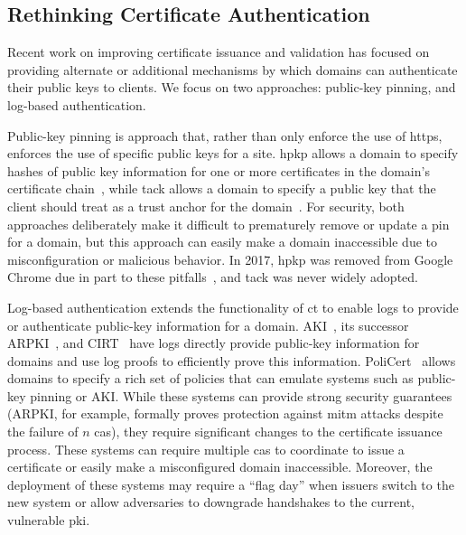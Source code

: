 \subsection{Rethinking Certificate Authentication}
\label{sec:background:issuance}

Recent work on improving certificate issuance and validation has focused on
providing alternate or additional mechanisms by which domains can authenticate
their public keys to clients. We focus on two approaches: public-key pinning,
and log-based authentication.

Public-key pinning is  approach that, rather than only enforce the use
of \ac{https}, enforces the use of specific public keys for a site. \ac{hpkp}
allows a domain to specify hashes of public key information for one or more
certificates in the domain's certificate chain~\cite{rfc7469}, while \ac{tack}
allows a domain to specify a public key that the client should treat as a trust
anchor for the domain~\cite{marlinspike2013trust}. For security, both approaches
deliberately make it difficult to prematurely remove or update a pin for a
domain, but this approach can easily make a domain inaccessible due to
misconfiguration or malicious behavior. In 2017, \ac{hpkp} was removed from
Google Chrome due in part to these pitfalls~\cite{palmer2017intent}, and
\ac{tack} was never widely adopted.

Log-based authentication extends the functionality of \ac{ct} to enable logs to
provide or authenticate public-key information for a domain.
AKI~\cite{kim2013accountable}, its successor ARPKI~\cite{basin2014arpki}, and
CIRT~\cite{ryan2014enhanced} have logs directly provide public-key information
for domains and use log proofs to efficiently prove this information.
PoliCert~\cite{szalachowski2014policert} allows domains to specify a rich set of
policies that can emulate systems such as public-key pinning or AKI. While these
systems can provide strong security guarantees (ARPKI, for example, formally
proves protection against \ac{mitm} attacks despite the failure of $n$
\acp{ca}), they require significant changes to the certificate issuance process.
These systems can require multiple \acp{ca} to coordinate to issue a certificate
or easily make a misconfigured domain inaccessible. Moreover, the deployment of
these systems may require a ``flag day'' when issuers switch to the new system
or allow adversaries to downgrade handshakes to the current, vulnerable
\ac{pki}.


